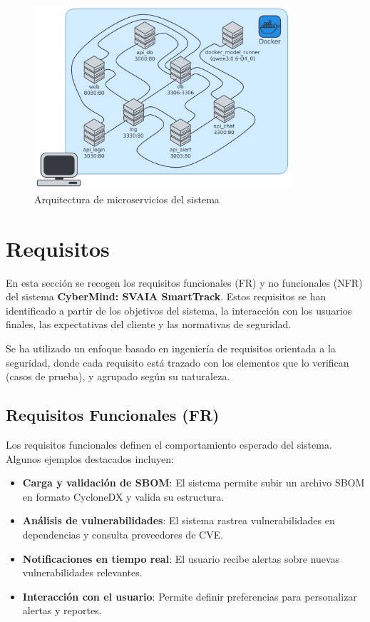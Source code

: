\documentclass[11pt]{article}
\begin{document}
\begin{figure}[H]
    \centering
    \includegraphics[width=0.85\textwidth]{images/diagram.png}
    \caption{Arquitectura de microservicios del sistema}
\end{figure}

\section{Requisitos}

En esta sección se recogen los requisitos funcionales (FR) y no funcionales (NFR) del sistema \textbf{CyberMind: SVAIA SmartTrack}. Estos requisitos se han identificado a partir de los objetivos del sistema, la interacción con los usuarios finales, las expectativas del cliente y las normativas de seguridad.

Se ha utilizado un enfoque basado en ingeniería de requisitos orientada a la seguridad, donde cada requisito está trazado con los elementos que lo verifican (casos de prueba), y agrupado según su naturaleza.

\subsection{Requisitos Funcionales (FR)}

Los requisitos funcionales definen el comportamiento esperado del sistema. Algunos ejemplos destacados incluyen:

\begin{itemize}
    \item \textbf{Carga y validación de SBOM}: El sistema permite subir un archivo SBOM en formato CycloneDX y valida su estructura.
    \item \textbf{Análisis de vulnerabilidades}: El sistema rastrea vulnerabilidades en dependencias y consulta proveedores de CVE.
    \item \textbf{Notificaciones en tiempo real}: El usuario recibe alertas sobre nuevas vulnerabilidades relevantes.
    \item \textbf{Interacción con el usuario}: Permite definir preferencias para personalizar alertas y reportes.
\end{itemize}
\end{document}
